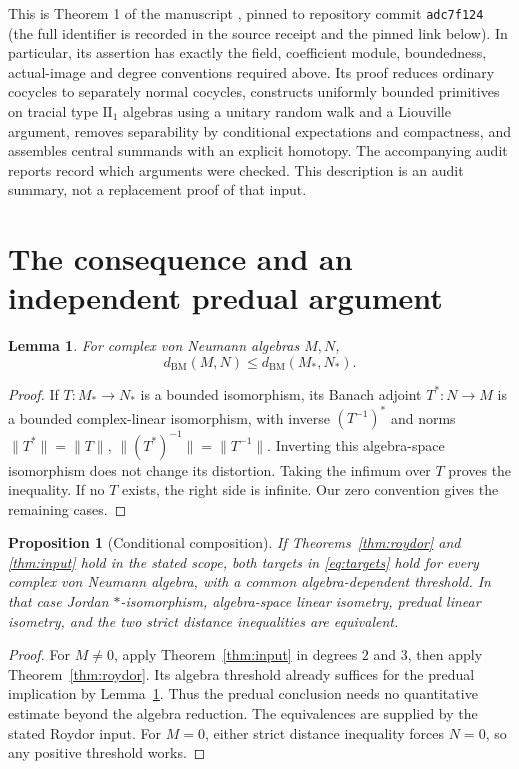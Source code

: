\documentclass[11pt]{article}
\newtheorem{proposition}[theorem]{Proposition}
\newtheorem{lemma}[theorem]{Lemma}
\newcommand{\BM}{d_{\mathrm{BM}}}
\begin{document}
This is Theorem 1 of the manuscript \cite{OAI295}, pinned to repository
commit \texttt{adc7f124} (the full identifier is recorded in the
source receipt and the pinned link below). In particular,
its assertion has exactly the field, coefficient module, boundedness,
actual-image and degree conventions required above. Its proof reduces
ordinary cocycles to separately normal cocycles, constructs uniformly
bounded primitives on tracial type $\mathrm{II}_1$ algebras using a
unitary random walk and a Liouville argument, removes separability by
conditional expectations and compactness, and assembles central
summands with an explicit homotopy. The accompanying audit reports
record which arguments were checked. This description is an audit
summary, not a replacement proof of that input.

\section{The consequence and an independent predual argument}

\begin{lemma}\label{lem:adjoint}
For complex von Neumann algebras $M,N$,
\[
 \BM(M,N)\le\BM(M_*,N_*).
\]
\end{lemma}
\begin{proof}
If $T:M_*\to N_*$ is a bounded isomorphism, its Banach adjoint
$T^*:N\to M$ is a bounded complex-linear isomorphism, with inverse
$(T^{-1})^*$ and norms $\|T^*\|=\|T\|$,
$\|(T^*)^{-1}\|=\|T^{-1}\|$. Inverting this algebra-space
isomorphism does not change its distortion. Taking the infimum over
$T$ proves the inequality. If no $T$ exists, the right side is
infinite. Our zero convention gives the remaining cases.
\end{proof}

\begin{proposition}[Conditional composition]\label{prop:consequence}
If Theorems~\ref{thm:roydor} and \ref{thm:input} hold in the stated
scope, both targets in \eqref{eq:targets} hold for every complex von
Neumann algebra, with a common algebra-dependent threshold. In that
case Jordan $*$-isomorphism, algebra-space linear isometry, predual
linear isometry, and the two strict distance inequalities are equivalent.
\end{proposition}
\begin{proof}
For $M\ne0$, apply Theorem~\ref{thm:input} in degrees $2$ and $3$,
then apply Theorem~\ref{thm:roydor}. Its algebra threshold already
suffices for the predual implication by Lemma~\ref{lem:adjoint}.
Thus the predual conclusion needs no quantitative estimate beyond the
algebra reduction. The equivalences are supplied by the stated Roydor
input. For $M=0$, either strict distance inequality forces $N=0$,
so any positive threshold works.
\end{proof}
\end{document}
